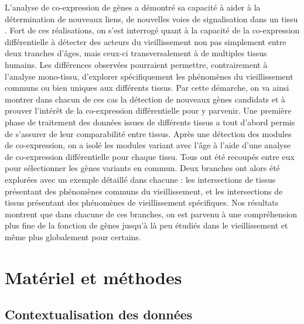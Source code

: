 L'analyse de co-expression de gènes a démontré sa capacité à aider à la détermination de nouveaux liens, de nouvelles voies de signalisation dans un tissu . 
Fort de ces réalisations, on s'est interrogé quant à la capacité de la co-expression différentielle à détecter des acteurs du vieillissement non pas simplement entre deux tranches d'âges, mais ceux-ci transversalement à de multiples tissus humains. 
Les différences observées pourraient permettre, contrairement à l'analyse mono-tissu, d'explorer spécifiquement les phénomènes du vieillissement communs ou bien uniques aux différents tissus. 
Par cette démarche, on va ainsi montrer dans chacun de ces cas la détection de nouveaux gènes candidats et à prouver l'intérêt de la co-expression différentielle pour y parvenir.
Une première phase de traitement des données issues de différents tissus a tout d'abord permis de s'assurer de leur comparabilité entre tissus. 
Après une détection des modules de co-expression, on a isolé les modules variant avec l'âge à l'aide d'une analyse de co-expression différentielle pour chaque tissu. Tous ont été recoupés entre eux pour sélectionner les gènes variants en commun. Deux branches ont alors été explorées avec un exemple détaillé dans chacune : les intersections de tissus présentant des phénomènes communs du vieillissement, et les intersections de tissus présentant des phénomènes de vieillissement spécifiques. 
Nos résultats montrent que dans chacune de ces branches, on est parvenu à une compréhension plus fine de la fonction de gènes jusqu'à là peu étudiés dans le vieillissement et même plus globalement pour certains.




\section{Matériel et méthodes}

\subsection{Contextualisation des données}

